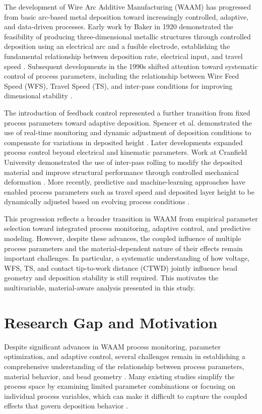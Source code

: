 \documentclass[conference]{IEEEtran}
\begin{document}
The development of Wire Arc Additive Manufacturing (WAAM) has progressed from basic arc-based metal deposition toward increasingly controlled, adaptive, and data-driven processes. Early work by Baker in 1920 demonstrated the feasibility of producing three-dimensional metallic structures through controlled deposition using an electrical arc and a fusible electrode, establishing the fundamental relationship between deposition rate, electrical input, and travel speed \cite{Baker1925}. Subsequent developments in the 1990s shifted attention toward systematic control of process parameters, including the relationship between Wire Feed Speed (WFS), Travel Speed (TS), and inter-pass conditions for improving dimensional stability \cite{Dickens1992}.

The introduction of feedback control represented a further transition from fixed process parameters toward adaptive deposition. Spencer et al. demonstrated the use of real-time monitoring and dynamic adjustment of deposition conditions to compensate for variations in deposited height \cite{Spencer1998}. Later developments expanded process control beyond electrical and kinematic parameters. Work at Cranfield University demonstrated the use of inter-pass rolling to modify the deposited material and improve structural performance through controlled mechanical deformation \cite{Williams2016}. More recently, predictive and machine-learning approaches have enabled process parameters such as travel speed and deposited layer height to be dynamically adjusted based on evolving process conditions \cite{Xiong2014}.

This progression reflects a broader transition in WAAM from empirical parameter selection toward integrated process monitoring, adaptive control, and predictive modeling. However, despite these advances, the coupled influence of multiple process parameters and the material-dependent nature of their effects remain important challenges. In particular, a systematic understanding of how voltage, WFS, TS, and contact tip-to-work distance (CTWD) jointly influence bead geometry and deposition stability is still required. This motivates the multivariable, material-aware analysis presented in this study.

\section{Research Gap and Motivation}

Despite significant advances in WAAM process monitoring, parameter optimization, and adaptive control, several challenges remain in establishing a comprehensive understanding of the relationship between process parameters, material behavior, and bead geometry \cite{Xiong2014,Guo2021MLAM,Sharma2022PhysicsML}. Many existing studies simplify the process space by examining limited parameter combinations or focusing on individual process variables, which can make it difficult to capture the coupled effects that govern deposition behavior \cite{mansor2024waam_opt,Lambiase2022,Karmuhilan2018}.
\end{document}
